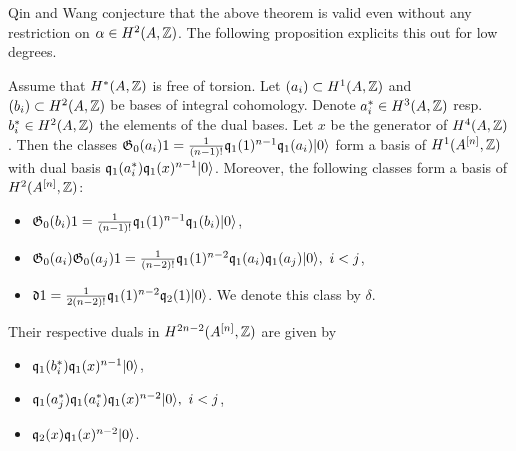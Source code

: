 \begin{remark}
Qin and Wang \cite{QinWang} conjecture that the above theorem is valid even without any restriction on $\alpha \in H^2(A,\mathbb{Z})$. The following proposition explicits this out for low degrees.
\end{remark}
\begin{proposition} Assume that $H^*(A,\mathbb{Z})$ is free of torsion.
Let $(a_i) \subset H^1(A,\mathbb{Z})$ and $(b_i)\subset H^2(A,\mathbb{Z})$ be bases of integral cohomology. Denote $a_i^*\in H^3(A,\mathbb{Z})$ resp.~$b_i^*\in H^2(A,\mathbb{Z})$ the elements of the dual bases. Let $x$ be the generator of $H^4(A,\mathbb{Z})$. Then the classes
$\mathfrak{G}_0(a_i)1 = \frac{1}{(n-1)!}\mathfrak{q}_{1}(1)^{n-1}\mathfrak{q}_{1}(a_{i})|0\rangle$ form a basis of $H^1(A^{[n]},\mathbb{Z})$ with dual basis
$\mathfrak{q}_1(a_i^*)\mathfrak{q}_1(x)^{n-1}|0\rangle$.
Moreover, the following classes form a basis of $H^2(A^{[n]},\mathbb{Z})$:
\begin{itemize}
 \item $\mathfrak{G}_0(b_i)1=\frac{1}{(n-1)!}\mathfrak{q}_{1}(1)^{n-1}\mathfrak{q}_{1}(b_{i})|0\rangle$,
 \item $\mathfrak{G}_0(a_i)\mathfrak{G}_0(a_j)1 = \frac{1}{(n-2)!}\mathfrak{q}_{1}(1)^{n-2}\mathfrak{q}_{1}(a_{i})\mathfrak{q}_{1}(a_{j})|0\rangle,\  i < j$,
 \item $\mathfrak{d} 1 =  \frac{1}{2(n-2)!}\mathfrak{q}_{1}(1)^{n-2}\mathfrak{q}_{2}(1) |0\rangle$. We denote this class by $\delta$.
\end{itemize}
Their respective duals in $H^{2n-2}(A^{[n]},\mathbb{Z})$ are given by
\begin{itemize}
 \item $\mathfrak{q}_{1}(b_{i}^*)\mathfrak{q}_{1}(x)^{n-1}|0\rangle$,
 \item $\mathfrak{q}_{1}(a_{j}^*)\mathfrak{q}_{1}(a_{i}^*)\mathfrak{q}_{1}(x)^{n-2}|0\rangle,\  i < j$,
 \item $\mathfrak{q}_2(x)\mathfrak{q}_{1}(x)^{n-2} |0\rangle$.
\end{itemize}
\end{proposition}
